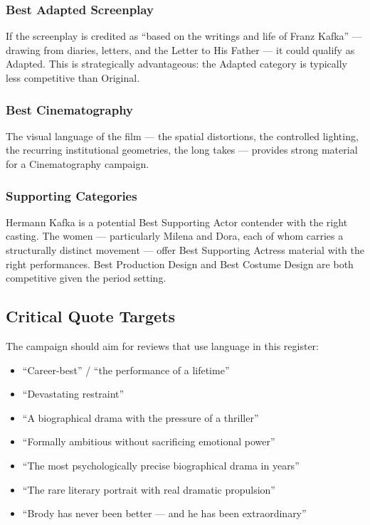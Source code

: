 \subsubsection{Best Adapted Screenplay}
If the screenplay is credited as ``based on the writings and life of Franz Kafka'' --- drawing from diaries, letters, and the Letter to His Father --- it could qualify as Adapted. This is strategically advantageous: the Adapted category is typically less competitive than Original.

\subsubsection{Best Cinematography}
The visual language of the film --- the spatial distortions, the controlled lighting, the recurring institutional geometries, the long takes --- provides strong material for a Cinematography campaign.

\subsubsection{Supporting Categories}
Hermann Kafka is a potential Best Supporting Actor contender with the right casting. The women --- particularly Milena and Dora, each of whom carries a structurally distinct movement --- offer Best Supporting Actress material with the right performances. Best Production Design and Best Costume Design are both competitive given the period setting.

\subsection{Critical Quote Targets}

The campaign should aim for reviews that use language in this register:
\begin{itemize}[leftmargin=*]
\item ``Career-best'' / ``the performance of a lifetime''
\item ``Devastating restraint''
\item ``A biographical drama with the pressure of a thriller''
\item ``Formally ambitious without sacrificing emotional power''
\item ``The most psychologically precise biographical drama in years''
\item ``The rare literary portrait with real dramatic propulsion''
\item ``Brody has never been better --- and he has been extraordinary''
\end{itemize}

